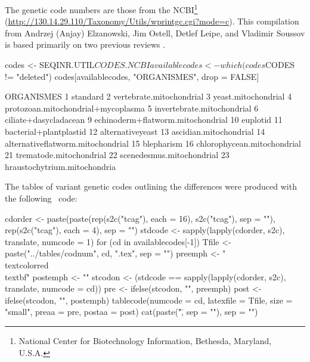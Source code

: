\documentclass{article}
\begin{document}
The genetic code numbers are those from the NCBI\footnote{
National Center for Biotechnology Information, Bethesda, Maryland, U.S.A.
} (\url{http://130.14.29.110/Taxonomy/Utils/wprintgc.cgi?mode=c}).
This compilation from Andrzej (Anjay) Elzanowski, Jim Ostell, Detlef Leipe, 
and Vladimir Soussov is based primarily on two previous reviews
\cite{OsawaS1992, JukesTH1993}.

\begin{Schunk}
\begin{Sinput}
 codes <- SEQINR.UTIL$CODES.NCBI
 availablecodes <- which(codes$CODES != "deleted")
 codes[availablecodes, "ORGANISMES", drop = FALSE]
\end{Sinput}
\begin{Soutput}
                           ORGANISMES
1                            standard
2            vertebrate.mitochondrial
3                 yeast.mitochondrial
4  protozoan.mitochondrial+mycoplasma
5          invertebrate.mitochondrial
6               ciliate+dasycladacean
9   echinoderm+flatworm.mitochondrial
10                           euplotid
11             bacterial+plantplastid
12                   alternativeyeast
13             ascidian.mitochondrial
14  alternativeflatworm.mitochondrial
15                         blepharism
16        chlorophycean.mitochondrial
21            trematode.mitochondrial
22          scenedesmus.mitochondrial
23       hraustochytrium.mitochondria
\end{Soutput}
\end{Schunk}

The tables of variant genetic codes outlining the differences were produced with the
following \Rlogo{}~code:

\begin{Schunk}
\begin{Sinput}
 cdorder <- paste(paste(rep(s2c("tcag"), each = 16), s2c("tcag"), 
     sep = ""), rep(s2c("tcag"), each = 4), sep = "")
 stdcode <- sapply(lapply(cdorder, s2c), translate, numcode = 1)
 for (cd in availablecodes[-1]) {
     Tfile <- paste("../tables/codnum", cd, ".tex", sep = "")
     preemph <- "\\textcolor{red}{\\textbf{"
     postemph <- "}}"
     stcodon <- (stdcode == sapply(lapply(cdorder, s2c), translate, 
         numcode = cd))
     pre <- ifelse(stcodon, "", preemph)
     post <- ifelse(stcodon, "", postemph)
     tablecode(numcode = cd, latexfile = Tfile, size = "small", 
         preaa = pre, postaa = post)
     cat(paste("\", sep = ""), sep = "\n")
 }
\end{Sinput}















\end{Schunk}
\end{document}
